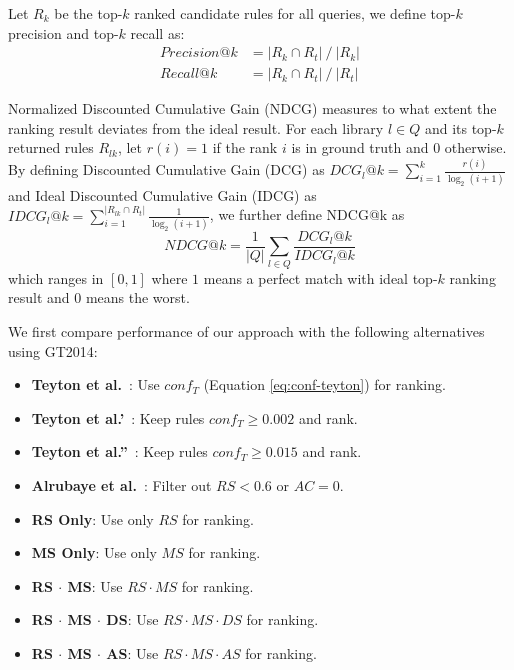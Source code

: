 \documentclass[conference, 10pt]{IEEEtran}
\begin{document}
Let $R_k$ be the top-$k$ ranked candidate rules for all queries, we define top-$k$ precision and top-$k$ recall as:
\begin{align}
    Precision@k &= |R_k \cap R_t| \mathbin{/} |R_k|\\
    Recall@k &= |R_k \cap R_t| \mathbin{/} |R_t|
\end{align}

Normalized Discounted Cumulative Gain (NDCG) measures to what extent the ranking result deviates from the ideal result. 
For each library $l \in Q$ and its top-$k$ returned rules $R_{lk}$, let $r(i)=1$ if the rank $i$ is in ground truth and 0 otherwise. 
By defining Discounted Cumulative Gain (DCG) as $DCG_l@k = \sum_{i=1}^k \frac{r(i)}{\log_2(i+1)}$ and Ideal Discounted Cumulative Gain (IDCG) as $IDCG_l@k = \sum_{i=1}^{|R_{lk}\cap R_t|} \frac{1}{\log_2(i+1)}$, we further define NDCG@k as
\begin{equation}
    NDCG@k=\frac{1}{|Q|}\sum_{l\in Q}\frac{DCG_l@k}{IDCG_l@k}
\end{equation}
which ranges in $[0,1]$ where $1$ means a perfect match with ideal top-$k$ ranking result and $0$ means the worst.

We first compare performance of our approach with the following alternatives using GT2014:
\begin{itemize}
    \item \textbf{Teyton et al.}~\cite{2012WCRE-Teyton-Mining}: Use $conf_T$ (Equation \ref{eq:conf-teyton}) for ranking.
    \item \textbf{Teyton et al.'}~\cite{2012WCRE-Teyton-Mining}: Keep rules $conf_T \ge 0.002$ and rank.
    \item \textbf{Teyton et al.''}~\cite{2012WCRE-Teyton-Mining}: Keep rules $conf_T \ge 0.015$ and rank.
    \item \textbf{Alrubaye et al.}~\cite{2019ICSME-Alrubaye-MigrationMiner}: Filter out $RS < 0.6$ or $AC = 0$.
    \item \textbf{RS Only}: Use only $RS$ for ranking.
    \item \textbf{MS Only}: Use only $MS$ for ranking.
    \item \textbf{RS $\cdot$ MS}: Use $RS \cdot MS$ for ranking.
    \item \textbf{RS $\cdot$ MS $\cdot$ DS}: Use $RS \cdot MS \cdot DS$ for ranking.
    \item \textbf{RS $\cdot$ MS $\cdot$ AS}: Use $RS \cdot MS \cdot AS$ for ranking.
\end{itemize}
\end{document}
